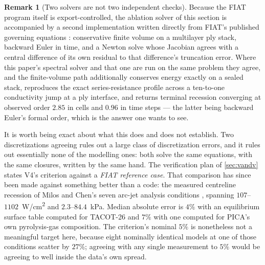 \documentclass[11pt,a4paper]{article}
\theoremstyle{definition}
\newtheorem{remark}[theorem]{Remark}
\numberwithin{equation}{section}
\begin{document}
\begin{remark}[Two solvers are not two independent checks]
\label{rem:crossver}
Because the FIAT program itself is export-controlled, the ablation solver of this section is accompanied by a second implementation written directly from FIAT's published governing equations \cite{chen1999, milos2006}: conservative finite volume on a multilayer ply stack, backward Euler in time, and a Newton solve whose Jacobian agrees with a central difference of its own residual to that difference's truncation error. Where this paper's spectral solver and that one are run on the same problem they agree, and the finite-volume path additionally conserves energy exactly on a sealed stack, reproduces the exact series-resistance profile across a ten-to-one conductivity jump at a ply interface, and returns terminal recession converging at observed order $2.85$ in cells and $0.96$ in time steps --- the latter being backward Euler's formal order, which is the answer one wants to see.

It is worth being exact about what this does and does not establish. Two discretizations agreeing rules out a large class of discretization errors, and it rules out essentially none of the modelling ones: both solve the same equations, with the same closures, written by the same hand. The verification plan of \cref{sec:vandv} states V4's criterion against a \emph{FIAT reference case}. That comparison has since been made against something better than a code: the measured centreline recession of Milos and Chen's seven arc-jet analysis conditions \cite{milos2010}, spanning $107$--$1102$~W/cm\textsuperscript{2} and $2.3$--$84.4$~kPa. Median absolute error is $4\%$ with an equilibrium surface table computed for TACOT-26 and $7\%$ with one computed for PICA's own pyrolysis-gas composition. The criterion's nominal $5\%$ is nonetheless not a meaningful target here, because eight nominally identical models at one of those conditions scatter by $27\%$; agreeing with any single measurement to $5\%$ would be agreeing to well inside the data's own spread.


\end{remark}
\end{document}
